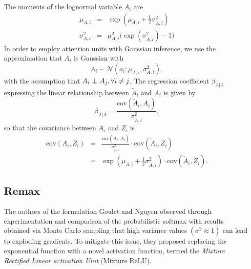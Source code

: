\documentclass{article}
\newcommand\independent{\protect\mathpalette{\protect\independenT}{\perp}}
\def\independenT#1#2{\mathrel{\rlap{$#1#2$}\mkern2mu{#1#2}}}
\begin{document}
\noindent The moments of the lognormal variable $A_i$ are
\begin{equation}
\label{eq_act}
\begin{array}{rcl}
\mu_{{A},i}&=&\exp(\mu_{\check{A},i}+\tfrac{1}{2}\sigma_{\check{A},i}^2)\\[2pt]
\sigma_{{A},i}^2&=&\mu_{{A},i}^2\big(\exp(\sigma_{\check{A},i}^2)-1\big)
\end{array}\end{equation}
In order to employ attention units with Gaussian inference, we use the approximation that $A_i$ is Gaussian with
$$A_i\sim\mathcal{N}(a_i;\mu_{{A},i},\sigma_{{A},i}^2),$$
with the assumption that  $A_i\independent A_j,\forall i\neq j$. The regression coefficient $\beta_{\check{A}|A}$ expressing the linear relationship between $\tilde{A}_i$ and $A_i$ is given by
\begin{equation}
\beta_{A|\check{A}}=\frac{\text{cov}(\check{A}_i,A_i)}{\sigma_{\check{A},i}^2},
\end{equation}
so that the covariance between $A_i$ and $Z_i$ is 
\begin{equation}
\begin{array}{rcl}
\text{cov}(A_i,Z_i)&=&\frac{\text{cov}(\check{A}_i,A_i)}{\sigma_{\check{A},i}^2}\cdot\text{cov}(\check{A}_i,Z_i)\\[4pt]
&=&\exp(\mu_{\check{A},i}+\tfrac{1}{2}\sigma_{\check{A},i}^2)\cdot\text{cov}(\check{A}_i,Z_i).\end{array}
\end{equation}

\subsection{Remax}
The authors of the formulation  Goulet and Nguyen observed through experimentation and comparison of the probabilistic softmax with results obtained via Monte Carlo sampling that high variance values $(\sigma^2 \approx 1)$ can lead to exploding gradients. To mitigate this issue, they proposed replacing the exponential function with a novel activation function, termed the \emph{Mixture Rectified Linear activation Unit} (Mixture ReLU).
\end{document}
